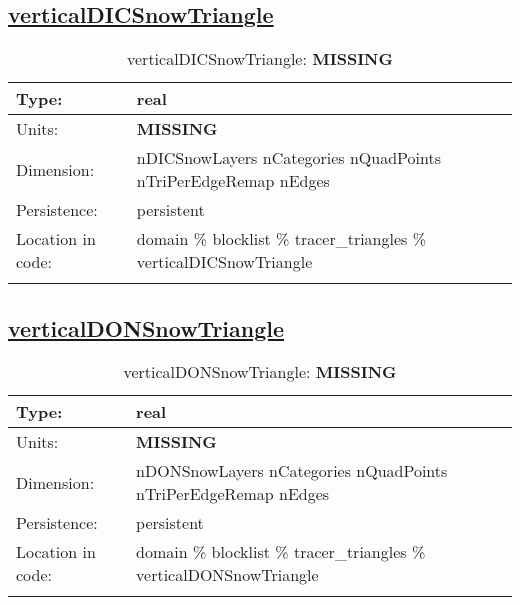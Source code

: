 \subsection[verticalDICSnowTriangle]{\hyperref[sec:var_tab_tracer_triangles]{verticalDICSnowTriangle}}
\label{subsec:var_sec_tracer_triangles_verticalDICSnowTriangle}
\begin{center}
\begin{longtable}{| p{2.0in} | p{4.0in} |}
        \hline 
        Type: & real \\
        \hline 
        Units: & {\bf \color{red} MISSING} \\
        \hline 
        Dimension: & nDICSnowLayers nCategories nQuadPoints nTriPerEdgeRemap nEdges \\
        \hline 
        Persistence: & persistent \\
        \hline 
         Location in code: & domain \% blocklist \% tracer\_triangles \% verticalDICSnowTriangle \\
         \hline 
    \caption{verticalDICSnowTriangle: {\bf \color{red} MISSING}}
\end{longtable}
\end{center}
\subsection[verticalDONSnowTriangle]{\hyperref[sec:var_tab_tracer_triangles]{verticalDONSnowTriangle}}
\label{subsec:var_sec_tracer_triangles_verticalDONSnowTriangle}
\begin{center}
\begin{longtable}{| p{2.0in} | p{4.0in} |}
        \hline 
        Type: & real \\
        \hline 
        Units: & {\bf \color{red} MISSING} \\
        \hline 
        Dimension: & nDONSnowLayers nCategories nQuadPoints nTriPerEdgeRemap nEdges \\
        \hline 
        Persistence: & persistent \\
        \hline 
         Location in code: & domain \% blocklist \% tracer\_triangles \% verticalDONSnowTriangle \\
         \hline 
    \caption{verticalDONSnowTriangle: {\bf \color{red} MISSING}}
\end{longtable}
\end{center}
